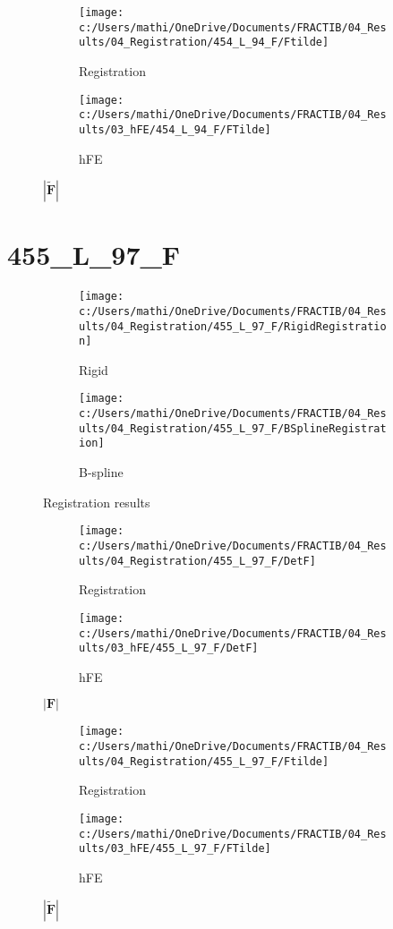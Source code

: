 \documentclass{article}%
\begin{document}
\begin{figure}[h!]%
\begin{subfigure}[b]{0.5\linewidth}%
\texttt{[image: c:/Users/mathi/OneDrive/Documents/FRACTIB/04\_Results/04\_Registration/454\_L\_94\_F/Ftilde]}%
\caption{Registration}%
\end{subfigure}%
\begin{subfigure}[b]{0.5\linewidth}%
\texttt{[image: c:/Users/mathi/OneDrive/Documents/FRACTIB/04\_Results/03\_hFE/454\_L\_94\_F/FTilde]}%
\caption{hFE}%
\end{subfigure}%
\caption{$|\widetilde{\mathbf{F}}|$}%
\end{figure}

%
\newpage%
\section*{455\_L\_97\_F}%
\label{sec:455L97F}%


\begin{figure}[h!]%
\begin{subfigure}[b]{0.5\linewidth}%
\texttt{[image: c:/Users/mathi/OneDrive/Documents/FRACTIB/04\_Results/04\_Registration/455\_L\_97\_F/RigidRegistration]}%
\caption{Rigid}%
\end{subfigure}%
\begin{subfigure}[b]{0.5\linewidth}%
\texttt{[image: c:/Users/mathi/OneDrive/Documents/FRACTIB/04\_Results/04\_Registration/455\_L\_97\_F/BSplineRegistration]}%
\caption{B{-}spline}%
\end{subfigure}%
\caption{Registration results}%
\end{figure}

%


\begin{figure}[h!]%
\begin{subfigure}[b]{0.5\linewidth}%
\texttt{[image: c:/Users/mathi/OneDrive/Documents/FRACTIB/04\_Results/04\_Registration/455\_L\_97\_F/DetF]}%
\caption{Registration}%
\end{subfigure}%
\begin{subfigure}[b]{0.5\linewidth}%
\texttt{[image: c:/Users/mathi/OneDrive/Documents/FRACTIB/04\_Results/03\_hFE/455\_L\_97\_F/DetF]}%
\caption{hFE}%
\end{subfigure}%
\caption{$|\mathbf{F}|$}%
\end{figure}

%


\begin{figure}[h!]%
\begin{subfigure}[b]{0.5\linewidth}%
\texttt{[image: c:/Users/mathi/OneDrive/Documents/FRACTIB/04\_Results/04\_Registration/455\_L\_97\_F/Ftilde]}%
\caption{Registration}%
\end{subfigure}%
\begin{subfigure}[b]{0.5\linewidth}%
\texttt{[image: c:/Users/mathi/OneDrive/Documents/FRACTIB/04\_Results/03\_hFE/455\_L\_97\_F/FTilde]}%
\caption{hFE}%
\end{subfigure}%
\caption{$|\widetilde{\mathbf{F}}|$}%
\end{figure}
\end{document}
